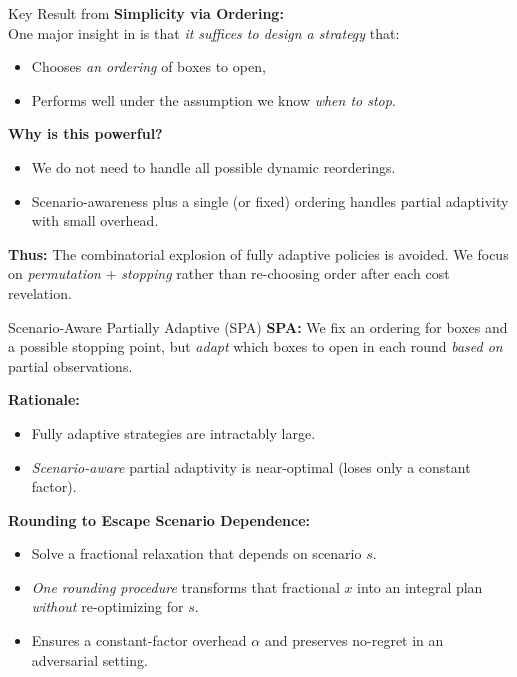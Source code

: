 \documentclass{beamer}
\begin{document}
    \begin{frame}{Key Result from \cite{CGT+20}}
    \textbf{Simplicity via Ordering:}\\
    One major insight in \cite{CGT+20} is that \emph{it suffices to design a strategy} that:
    \begin{itemize}
        \item Chooses \emph{an ordering} of boxes to open,
        \item Performs well under the assumption we know \emph{when to stop}.
    \end{itemize}
    
    \vspace{0.5em}
    \textbf{Why is this powerful?}
    \begin{itemize}
        \item We do not need to handle all possible dynamic reorderings.
        \item Scenario-awareness plus a single (or fixed) ordering handles partial adaptivity with small overhead.
    \end{itemize}
    
    \textbf{Thus:} The combinatorial explosion of fully adaptive policies is avoided. We focus on \emph{permutation} + \emph{stopping} rather than re-choosing order after each cost revelation.
    \end{frame}
    
    
    \begin{frame}{Scenario-Aware Partially Adaptive (SPA)}
    \textbf{SPA:} We fix an ordering for boxes and a possible stopping point, but \emph{adapt} which boxes to open in each round \emph{based on} partial observations.
    
    \textbf{Rationale:}
    \begin{itemize}
        \item Fully adaptive strategies are intractably large.
        \item \emph{Scenario-aware} partial adaptivity is near-optimal (loses only a constant factor).
    \end{itemize}
    
    \textbf{Rounding to Escape Scenario Dependence:}
    \begin{itemize}
        \item Solve a fractional relaxation that depends on scenario $s$.
        \item \emph{One rounding procedure} transforms that fractional $x$ into an integral plan \emph{without} re-optimizing for $s$.
        \item Ensures a constant-factor overhead $\alpha$ and preserves no-regret in an adversarial setting.
    \end{itemize}
    \end{frame}
    
\end{document}

